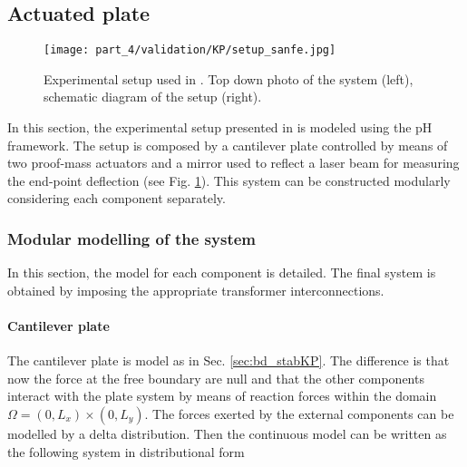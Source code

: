 \subsection{Actuated plate}

\begin{figure}[tb]
	\centering
	\texttt{[image: part\_4/validation/KP/setup\_sanfe.jpg]} 
	\caption{Experimental setup used in \cite{preda2020}. Top down photo of the system (left), schematic diagram of the setup (right).}
	\label{fig:setup_sanfe}
\end{figure}

In this section, the experimental setup presented in \cite{preda2020} is modeled using the pH framework. The setup is composed by a cantilever plate controlled by means of two proof-mass actuators and a mirror used to reflect a laser beam for measuring the end-point deflection (see Fig. \ref{fig:setup_sanfe}).
This system can be constructed modularly considering each component separately. 

\subsubsection{Modular modelling of the system}
In this section, the model for each component is detailed. The final system is obtained by imposing the appropriate transformer interconnections.

\paragraph{Cantilever plate} The cantilever plate is model as in Sec. \ref{sec:bd_stabKP}. The difference is that now the force at the free boundary are null and that the other components interact with the plate system by means of reaction forces within the domain $\Omega = (0, L_x) \times (0, L_y)$. The forces exerted by the external components can be modelled by a delta distribution. Then the continuous model can be written as the following system in distributional form

